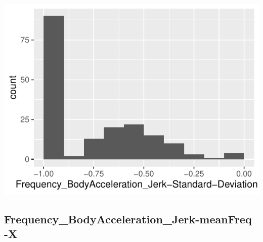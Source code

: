 \documentclass[
]{article}
\begin{document}
\begin{minipage}{0.25 \textwidth}

\includegraphics{codebook_tidydatasub_files/figure-latex/Var-57-Frequency-BodyAcceleration-Jerk-Standard-Deviation--Z-1.pdf}

\end{minipage}

\noindent\makebox[\linewidth]{\rule{\textwidth}{0.4pt}}

\hypertarget{frequency_bodyacceleration_jerk-meanfreq--x}{%
\subsection{Frequency\_BodyAcceleration\_Jerk-meanFreq
-X}\label{frequency_bodyacceleration_jerk-meanfreq--x}}
\end{document}
